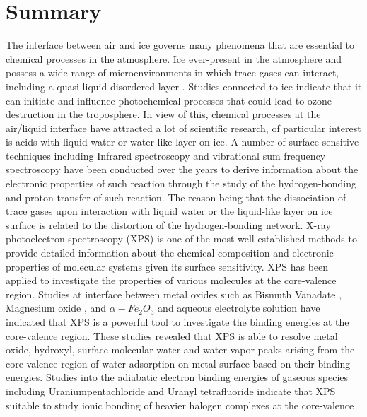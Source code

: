 \documentclass[a4paper,11pt]{report}
\begin{document}
\chapter{Summary}
The interface between air and ice governs many phenomena that are essential to chemical processes in the atmosphere.
Ice ever-present in the atmosphere and possess a wide range of microenvironments in which trace gases can interact, 
including a quasi-liquid disordered layer \citep{toubin2001dynamics, bartels2014review}. Studies connected to ice indicate that it  
can initiate and influence photochemical processes that could lead to ozone destruction \citep{solomon1999stratospheric,abbatt2003interactions}
in the troposphere. In view of this, chemical processes at the air/liquid interface have attracted a lot of scientific research,
of particular interest is acids with liquid water or water-like layer on ice.
A number of surface sensitive  techniques including Infrared spectroscopy \citep{darvas2012adsorption} and vibrational sum frequency spectroscopy \citep{gordon2018model} have been conducted over the years to derive information  about the electronic properties of such reaction through the study
of the hydrogen-bonding and proton transfer of such reaction. The reason being that the dissociation of trace gases upon interaction with
liquid water or the liquid-like layer on ice surface is related to the distortion of the hydrogen-bonding network.
X-ray photoelectron spectroscopy (XPS) is one of the most well-established methods to provide detailed information about the chemical
composition and electronic properties of molecular systems \citep{hufner2013photoelectron} given its surface sensitivity.
XPS has been applied to investigate the properties of various molecules at the core-valence region. Studies at interface between metal oxides 
such as Bismuth Vanadate \citep{starr2017combined}, Magnesium oxide \citep{newberg2011formation}, and $\alpha-Fe_{2}O_{3}$  \citep{yamamoto2010water} and aqueous electrolyte solution have indicated that
XPS is a powerful tool to investigate the binding energies at the core-valence region. These studies revealed that XPS is able to resolve
metal oxide, hydroxyl, surface molecular water and water vapor peaks arising from the core-valence region of water adsorption on metal surface 
based on their binding energies. Studies into the adiabatic electron binding energies of gaseous species including Uraniumpentachloride
\citep{su2013joint} and Uranyl tetrafluoride \citep{dau2012observation} indicate that XPS suitable to study ionic bonding of heavier halogen complexes at the core-valence
\end{document}
